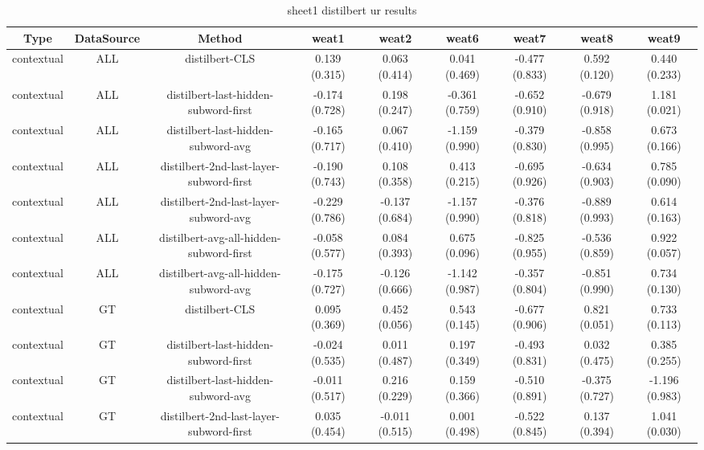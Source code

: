 \begin{sidewaystable}[htb]
    \centering
    \caption{sheet1 distilbert ur results}
    \label{appendix_tab:sheet1_distilbert_ur_results}
    \small
    \begin{tabular}{@{}ccccccccc@{}}
        \toprule
        Type & DataSource & Method & weat1 & weat2 & weat6 & weat7 & weat8 & weat9 \\
        \midrule
        contextual & ALL & distilbert-CLS & 0.139 (0.315) & 0.063 (0.414) & 0.041 (0.469) & -0.477 (0.833) & 0.592 (0.120) & 0.440 (0.233) \\
        contextual & ALL & distilbert-last-hidden-subword-first & -0.174 (0.728) & 0.198 (0.247) & -0.361 (0.759) & -0.652 (0.910) & -0.679 (0.918) & 1.181 (0.021) \\
        contextual & ALL & distilbert-last-hidden-subword-avg & -0.165 (0.717) & 0.067 (0.410) & -1.159 (0.990) & -0.379 (0.830) & -0.858 (0.995) & 0.673 (0.166) \\
        contextual & ALL & distilbert-2nd-last-layer-subword-first & -0.190 (0.743) & 0.108 (0.358) & 0.413 (0.215) & -0.695 (0.926) & -0.634 (0.903) & 0.785 (0.090) \\
        contextual & ALL & distilbert-2nd-last-layer-subword-avg & -0.229 (0.786) & -0.137 (0.684) & -1.157 (0.990) & -0.376 (0.818) & -0.889 (0.993) & 0.614 (0.163) \\
        contextual & ALL & distilbert-avg-all-hidden-subword-first & -0.058 (0.577) & 0.084 (0.393) & 0.675 (0.096) & -0.825 (0.955) & -0.536 (0.859) & 0.922 (0.057) \\
        contextual & ALL & distilbert-avg-all-hidden-subword-avg & -0.175 (0.727) & -0.126 (0.666) & -1.142 (0.987) & -0.357 (0.804) & -0.851 (0.990) & 0.734 (0.130) \\
        contextual & GT & distilbert-CLS & 0.095 (0.369) & 0.452 (0.056) & 0.543 (0.145) & -0.677 (0.906) & 0.821 (0.051) & 0.733 (0.113) \\
        contextual & GT & distilbert-last-hidden-subword-first & -0.024 (0.535) & 0.011 (0.487) & 0.197 (0.349) & -0.493 (0.831) & 0.032 (0.475) & 0.385 (0.255) \\
        contextual & GT & distilbert-last-hidden-subword-avg & -0.011 (0.517) & 0.216 (0.229) & 0.159 (0.366) & -0.510 (0.891) & -0.375 (0.727) & -1.196 (0.983) \\
        contextual & GT & distilbert-2nd-last-layer-subword-first & 0.035 (0.454) & -0.011 (0.515) & 0.001 (0.498) & -0.522 (0.845) & 0.137 (0.394) & 1.041 (0.030) \\

\end{tabular}
\end{sidewaystable}
